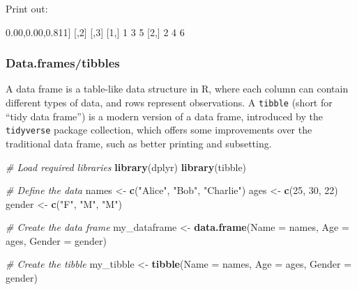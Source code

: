 \documentclass[
]{book}
\newenvironment{Shaded}{\begin{snugshade}}{\end{snugshade}}
\newcommand{\AttributeTok}[1]{\textcolor[rgb]{0.13,0.29,0.53}{#1}}
\newcommand{\CommentTok}[1]{\textcolor[rgb]{0.56,0.35,0.01}{\textit{#1}}}
\newcommand{\DecValTok}[1]{\textcolor[rgb]{0.00,0.00,0.81}{#1}}
\newcommand{\FunctionTok}[1]{\textcolor[rgb]{0.13,0.29,0.53}{\textbf{#1}}}
\newcommand{\NormalTok}[1]{#1}
\newcommand{\OtherTok}[1]{\textcolor[rgb]{0.56,0.35,0.01}{#1}}
\newcommand{\StringTok}[1]{\textcolor[rgb]{0.31,0.60,0.02}{#1}}
\begin{document}
Print out:

\begin{Shaded}
\begin{Highlighting}[]
\NormalTok{     [,}\DecValTok{1}\NormalTok{] [,}\DecValTok{2}\NormalTok{] [,}\DecValTok{3}\NormalTok{]}
\NormalTok{[}\DecValTok{1}\NormalTok{,]    }\DecValTok{1}    \DecValTok{3}    \DecValTok{5}
\NormalTok{[}\DecValTok{2}\NormalTok{,]    }\DecValTok{2}    \DecValTok{4}    \DecValTok{6}
\end{Highlighting}
\end{Shaded}

\hypertarget{data.framestibbles}{%
\subsubsection{Data.frames/tibbles}\label{data.framestibbles}}

A data frame is a table-like data structure in R, where each column can contain different types of data, and rows represent observations. A \texttt{tibble} (short for ``tidy data frame'') is a modern version of a data frame, introduced by the \texttt{tidyverse} package collection, which offers some improvements over the traditional data frame, such as better printing and subsetting.

\begin{Shaded}
\begin{Highlighting}[]
\CommentTok{\# Load required libraries}
\FunctionTok{library}\NormalTok{(dplyr)}
\FunctionTok{library}\NormalTok{(tibble)}

\CommentTok{\# Define the data}
\NormalTok{names }\OtherTok{\textless{}{-}} \FunctionTok{c}\NormalTok{(}\StringTok{"Alice"}\NormalTok{, }\StringTok{"Bob"}\NormalTok{, }\StringTok{"Charlie"}\NormalTok{)}
\NormalTok{ages }\OtherTok{\textless{}{-}} \FunctionTok{c}\NormalTok{(}\DecValTok{25}\NormalTok{, }\DecValTok{30}\NormalTok{, }\DecValTok{22}\NormalTok{)}
\NormalTok{gender }\OtherTok{\textless{}{-}} \FunctionTok{c}\NormalTok{(}\StringTok{"F"}\NormalTok{, }\StringTok{"M"}\NormalTok{, }\StringTok{"M"}\NormalTok{)}

\CommentTok{\# Create the data frame}
\NormalTok{my\_dataframe }\OtherTok{\textless{}{-}} \FunctionTok{data.frame}\NormalTok{(}\AttributeTok{Name =}\NormalTok{ names, }\AttributeTok{Age =}\NormalTok{ ages, }\AttributeTok{Gender =}\NormalTok{ gender)}

\CommentTok{\# Create the tibble}
\NormalTok{my\_tibble }\OtherTok{\textless{}{-}} \FunctionTok{tibble}\NormalTok{(}\AttributeTok{Name =}\NormalTok{ names, }\AttributeTok{Age =}\NormalTok{ ages, }\AttributeTok{Gender =}\NormalTok{ gender)}
\end{Highlighting}
\end{Shaded}
\end{document}
